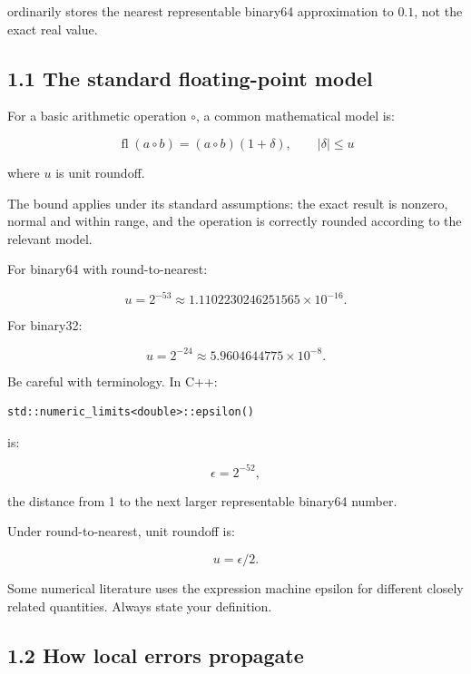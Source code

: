 ordinarily stores the nearest representable binary64 approximation to \(0.1\), not the exact real value.

\subsection{1.1 The standard floating-point model}\label{02-foundations-ii-ch028-the-standard-floating-point-model}

\hypertarget{02-foundations-ii-ch028-the-standard-floating-point-model}{}

For a basic arithmetic operation \(\circ\), a common mathematical model is:

\[ \boxed{ \operatorname{fl}(a\circ b) = (a\circ b)(1+\delta), \qquad |\delta|\le u } \]

where \(u\) is unit roundoff.

The bound applies under its standard assumptions: the exact result is nonzero, normal and within range, and the operation is correctly rounded according to the relevant model.

For binary64 with round-to-nearest:

\[ \boxed{u=2^{-53}\approx1.1102230246251565\times10^{-16}}. \]

For binary32:

\[ \boxed{u=2^{-24}\approx5.9604644775\times10^{-8}}. \]

Be careful with terminology. In C++:

\begin{verbatim}
std::numeric_limits<double>::epsilon()
\end{verbatim}

is:

\[ \boxed{\epsilon=2^{-52}}, \]

the distance from 1 to the next larger representable binary64 number.

Under round-to-nearest, unit roundoff is:

\[ u=\epsilon/2. \]

Some numerical literature uses the expression machine epsilon for different closely related quantities. Always state your definition.

\subsection{1.2 How local errors propagate}\label{02-foundations-ii-ch028-how-local-errors-propagate}

\hypertarget{02-foundations-ii-ch028-how-local-errors-propagate}{}

